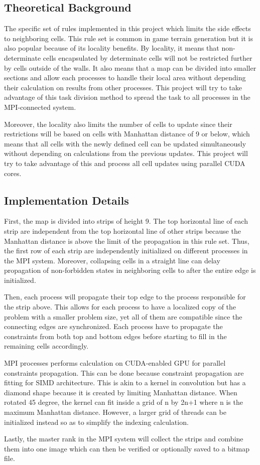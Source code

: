 \subsection{Theoretical Background}
The specific set of rules implemented in this project which limits the side effects to neighboring cells. This rule set is common in game terrain generation but it is also popular because of its locality benefits. 
By locality, it means that non-determinate cells encapsulated by determinate cells will not be restricted further by cells outside of the walls. 
It also means that a map can be divided into smaller sections and allow each processes to handle their local area without depending their calculation on results from other processes. This project will try to take advantage of this task division method to spread the task to all processes in the MPI-connected system.

Moreover, the locality also limits the number of cells to update since their restrictions will be based on cells with Manhattan distance of 9 or below, which means that all cells with the newly defined cell can be updated simultaneously without depending on calculations from the previous updates. This project will try to take advantage of this and process all cell updates using parallel CUDA cores.


\subsection{Implementation Details}

First, the map is divided into strips of height 9. The top horizontal line of each strip are independent from the top horizontal line of other strips because the Manhattan distance is above the limit of the propagation in this rule set.
Thus, the first row of each strip are independently initialized on different processes in the MPI system. Moreover, collapsing cells in a straight line can delay propagation of non-forbidden states in neighboring cells to after the entire edge is initialized.

Then, each process will propagate their top edge to the process responsible for the strip above. This allows for each process to have a localized copy of the problem with a smaller problem size, yet all of them are compatible since the connecting edges are synchronized. Each process have to propagate the constraints from both top and bottom edges before starting to fill in the remaining cells accordingly. 

MPI processes performs calculation on CUDA-enabled GPU for parallel constraints propagation. This can be done because constraint propagation are fitting for SIMD architecture. This is akin to a kernel in convolution but has a diamond shape because it is created by limiting Manhattan distance. When rotated 45 degree, the kernel can fit inside a grid of n by 2n+1 where n is the maximum Manhattan distance. However, a larger grid of threads can be initialized instead so as to simplify the indexing calculation. 

Lastly, the master rank in the MPI system will collect the strips and combine them into one image which can then be verified or optionally saved to a bitmap file.
